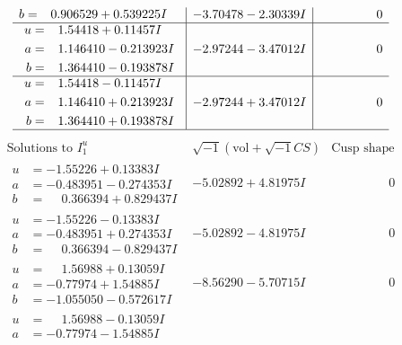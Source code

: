 \documentclass[1p]{elsarticle_modified}
\theoremstyle{definition}
\newcommand{\I}{\sqrt{-1}}
\begin{document}
$$\begin{array}{c|c|c}
\begin{aligned}
b &= \phantom{-}0.906529 + 0.539225 I\end{aligned}
 & -3.70478 - 2.30339 I & \phantom{-0.000000 } 0 \\ \hline\begin{aligned}
u &= \phantom{-}1.54418 + 0.11457 I \\
a &= \phantom{-}1.146410 - 0.213923 I \\
b &= \phantom{-}1.364410 - 0.193878 I\end{aligned}
 & -2.97244 - 3.47012 I & \phantom{-0.000000 } 0 \\ \hline\begin{aligned}
u &= \phantom{-}1.54418 - 0.11457 I \\
a &= \phantom{-}1.146410 + 0.213923 I \\
b &= \phantom{-}1.364410 + 0.193878 I\end{aligned}
 & -2.97244 + 3.47012 I & \phantom{-0.000000 } 0\\
 \hline 
 \end{array}$$\newpage$$\begin{array}{c|c|c}  
\text{Solutions to }I^u_{1}& \I (\text{vol} + \sqrt{-1}CS) & \text{Cusp shape}\\
 \hline 
\begin{aligned}
u &= -1.55226 + 0.13383 I \\
a &= -0.483951 - 0.274353 I \\
b &= \phantom{-}0.366394 + 0.829437 I\end{aligned}
 & -5.02892 + 4.81975 I & \phantom{-0.000000 } 0 \\ \hline\begin{aligned}
u &= -1.55226 - 0.13383 I \\
a &= -0.483951 + 0.274353 I \\
b &= \phantom{-}0.366394 - 0.829437 I\end{aligned}
 & -5.02892 - 4.81975 I & \phantom{-0.000000 } 0 \\ \hline\begin{aligned}
u &= \phantom{-}1.56988 + 0.13059 I \\
a &= -0.77974 + 1.54885 I \\
b &= -1.055050 - 0.572617 I\end{aligned}
 & -8.56290 - 5.70715 I & \phantom{-0.000000 } 0 \\ \hline\begin{aligned}
u &= \phantom{-}1.56988 - 0.13059 I \\
a &= -0.77974 - 1.54885 I \\

\end{aligned}
\end{array}$$
\end{document}
